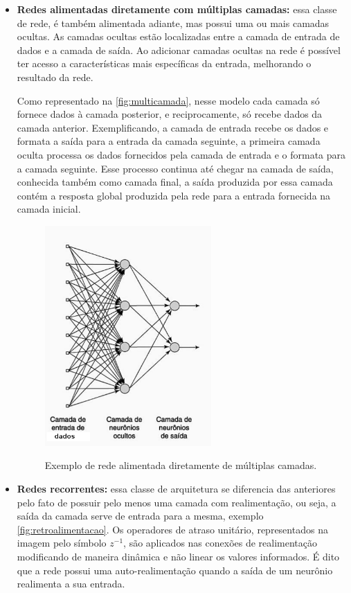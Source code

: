 \begin{itemize}
\item \textbf{Redes alimentadas diretamente com múltiplas camadas:} essa classe de rede, é também alimentada adiante, mas possui uma ou mais camadas ocultas. As camadas ocultas estão localizadas entre a camada de entrada de dados e a camada de saída. Ao adicionar camadas ocultas na rede é  possível ter acesso a características mais específicas da entrada, melhorando o resultado da rede.
\par Como representado na \autoref{fig:multicamada}, nesse modelo cada camada só fornece dados à camada posterior, e reciprocamente, só recebe dados da camada anterior. Exemplificando, a camada de entrada recebe os dados e formata a saída para a entrada da camada seguinte, a primeira camada oculta processa os dados fornecidos pela camada de entrada e o formata para a camada seguinte. Esse processo continua até chegar na camada de saída, conhecida também como camada final, a saída produzida por essa camada contém a resposta global produzida pela rede para a entrada fornecida na camada inicial.
\begin{figure}[H]
  \centering
  \caption{Exemplo de rede alimentada diretamente de múltiplas camadas.}
  \includegraphics[width=180pt]{dados/figuras/multi_camadas}
  \label{fig:multicamada}
\end{figure}
\item \textbf{Redes recorrentes:} essa classe de arquitetura se diferencia das anteriores pelo fato de possuir pelo menos uma camada com realimentação, ou seja, a saída da camada serve de entrada para a mesma, exemplo \autoref{fig:retroalimentacao}. Os operadores de atraso unitário, representados na imagem pelo símbolo $z^{-1}$, são aplicados nas conexões de realimentação modificando de maneira dinâmica e não linear os valores informados. É dito que a rede possui uma auto-realimentação quando a saída de um neurônio realimenta a sua entrada.

\end{itemize}
